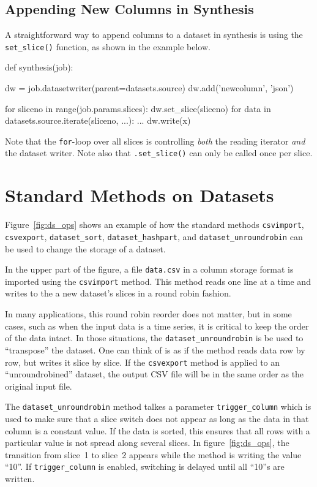 \subsection{Appending New Columns in Synthesis}

A straightforward way to append columns to a dataset in synthesis is
using the \texttt{set\_slice()} function, as shown in the example
below.
\begin{python}
def synthesis(job):

    dw = job.datasetwriter(parent=datasets.source)
    dw.add('newcolumn', 'json')
    
    for sliceno in range(job.params.slices):
        dw.set_slice(sliceno)
        for data in datasets.source.iterate(sliceno, ...):
            ...
            dw.write(x)
\end{python}
Note that the \texttt{for}-loop over all slices is
controlling \textsl{both} the reading iterator \textsl{and} the
dataset writer.  Note also that \texttt{.set\_slice()} can only be
called once per slice.



\section{Standard Methods on Datasets}
Figure~\ref{fig:ds_ops} shows an example of how the standard
methods \texttt{csvimport}, \texttt{csvexport}, \texttt{dataset\_sort}, \texttt{dataset\_hashpart},
and \texttt{dataset\_unroundrobin} can be used to change the storage
of a dataset.

In the upper part of the figure, a file \texttt{data.csv} in a column
storage format is imported using the \texttt{csvimport} method.  This
method reads one line at a time and writes to the a new dataset's
slices in a round robin fashion.

In many applications, this round robin reorder does not matter, but in
some cases, such as when the input data is a time series, it is
critical to keep the order of the data intact.  In those situations,
the \texttt{dataset\_unroundrobin} is be used to ``transpose'' the
dataset.  One can think of is as if the method reads data row by row,
but writes it slice by slice.  If the \texttt{csvexport} method is
applied to an ``unroundrobined'' dataset, the output CSV file will be
in the same order as the original input file.

The \texttt{dataset\_unroundrobin} method talkes a
parameter \texttt{trigger\_column} which is used to make sure that a
slice switch does not appear as long as the data in that column is a
constant value.  If the data is sorted, this ensures that all rows
with a particular value is not spread along several slices.  In
figure~\ref{fig:ds_ops}, the transition from slice~1 to slice~2
appears while the method is writing the value ``10''.  If
\texttt{trigger\_column} is enabled, switching is delayed until all ``10''s
are written.

